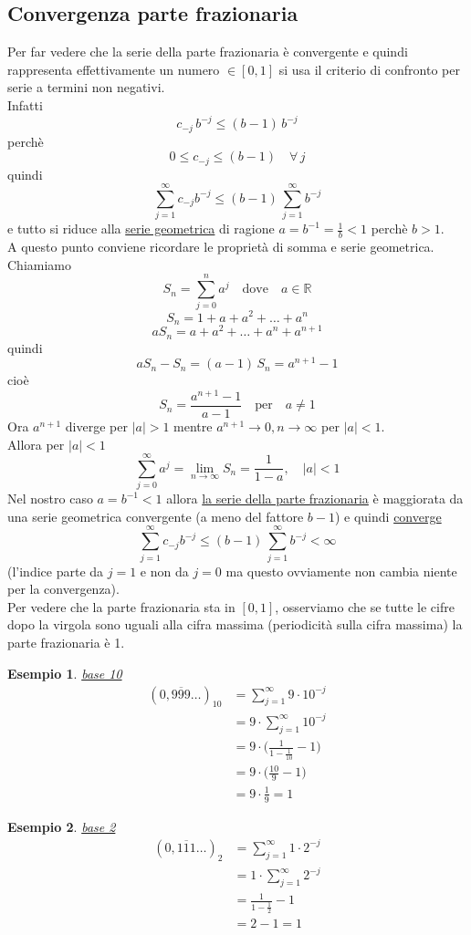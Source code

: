 \documentclass[12pt]{article}
\newtheorem*{esempio}{Esempio}
\begin{document}
\subsection{Convergenza parte frazionaria}
Per far vedere che la serie della parte frazionaria è convergente e quindi rappresenta effettivamente un numero $\in [0,1]$ si usa il criterio di confronto per serie a termini non negativi. \\
Infatti \[ c_{-j}\,b^{-j} \le (b-1)\,b^{-j} \]
perchè \[ 0 \le c_{-j} \le (b-1) \quad \forall \, j \]
quindi \[ \sum_{j=1}^{\infty}c_{-j}b^{-j} \le (b-1)\,\sum_{j=1}^{\infty}b^{-j} \]
e tutto si riduce alla \uline{serie geometrica} di ragione $a = b^{-1} = \frac{1}{b} < 1$ perchè $b > 1$.\\
A questo punto conviene ricordare le proprietà di somma e serie geometrica. 
Chiamiamo \[ S_n = \sum_{j=0}^{n}a^j \quad \text{dove} \quad a \in \mathbb{R} \]
\[ S_n = 1 + a + a^2 + \dotsc + a^n \]
\[ aS_n = a + a^2 + \dotsc + a^n + a^{n+1} \]
quindi \[ aS_n - S_n = (a - 1)\,S_n = a^{n+1} -1 \]
cioè \[ S_n = \frac{a^{n+1} - 1}{a - 1} \quad \text{per} \quad a \ne 1 \]
Ora $a^{n+1}$ diverge per $\lvert a\rvert > 1$ mentre $a^{n+1} \longrightarrow 0 , n \to \infty $ per $\lvert a\rvert < 1$.\\
Allora per $\lvert a\rvert < 1$
\[ \sum_{j=0}^{\infty}a^j = \lim_{n \to \infty} S_n = \frac{1}{1 - a} , \quad \lvert a\rvert < 1 \]
Nel nostro caso $a = b^{-1} < 1$ allora \uline{la serie della parte frazionaria} è maggiorata da una serie geometrica convergente (a meno del fattore $b-1$) e quindi \uline{converge}
\[ \sum_{j=1}^{\infty}c_{-j}b^{-j} \le (b-1)\,\sum_{j=1}^{\infty}b^{-j} < \infty \]
(l'indice parte da $j = 1$ e non da $j = 0$ ma questo ovviamente non cambia niente per la convergenza). \\
Per vedere che la parte frazionaria sta in $[0,1]$, osserviamo che se tutte le cifre dopo la virgola sono uguali alla cifra massima (periodicità sulla cifra massima) la parte frazionaria è 1.

\begin{esempio}
\uline{base 10}
\[ \begin{split}
    (0,\overline{999} \dotsc)_{10} & = \sum_{j=1}^{\infty} 9 \cdot 10^{-j} \\
    & = 9 \cdot \sum_{j=1}^{\infty} 10^{-j} \\
    & = 9 \cdot \biggl( \frac{1}{1 - \frac{1}{10}} - 1 \biggr) \\
    & = 9 \cdot \biggl( \frac{10}{9} - 1 \biggr) \\
    & = 9 \cdot \frac{1}{9} = 1
\end{split} \]
\end{esempio}
\begin{esempio}
\uline{base 2}
\[ \begin{split}
    (0,\overline{111} \dotsc)_{2} & = \sum_{j=1}^{\infty} 1 \cdot 2^{-j} \\
    & = 1 \cdot \sum_{j=1}^{\infty} 2^{-j} \\
    & = \frac{1}{1 - \frac{1}{2}} - 1 \\
    & = 2 - 1 = 1
\end{split} \]
\end{esempio}
\end{document}
